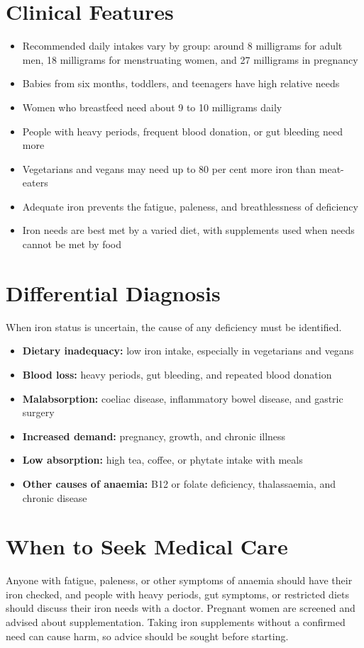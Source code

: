 \section*{Clinical Features}
\begin{itemize}
    \item Recommended daily intakes vary by group: around 8 milligrams for adult men, 18 milligrams for menstruating women, and 27 milligrams in pregnancy
    \item Babies from six months, toddlers, and teenagers have high relative needs
    \item Women who breastfeed need about 9 to 10 milligrams daily
    \item People with heavy periods, frequent blood donation, or gut bleeding need more
    \item Vegetarians and vegans may need up to 80 per cent more iron than meat-eaters
    \item Adequate iron prevents the fatigue, paleness, and breathlessness of deficiency
    \item Iron needs are best met by a varied diet, with supplements used when needs cannot be met by food
\end{itemize}

\section*{Differential Diagnosis}
When iron status is uncertain, the cause of any deficiency must be identified.
\begin{itemize}
    \item \textbf{Dietary inadequacy:} low iron intake, especially in vegetarians and vegans
    \item \textbf{Blood loss:} heavy periods, gut bleeding, and repeated blood donation
    \item \textbf{Malabsorption:} coeliac disease, inflammatory bowel disease, and gastric surgery
    \item \textbf{Increased demand:} pregnancy, growth, and chronic illness
    \item \textbf{Low absorption:} high tea, coffee, or phytate intake with meals
    \item \textbf{Other causes of anaemia:} B12 or folate deficiency, thalassaemia, and chronic disease
\end{itemize}

\section*{When to Seek Medical Care}
Anyone with fatigue, paleness, or other symptoms of anaemia should have their iron checked, and people with heavy periods, gut symptoms, or restricted diets should discuss their iron needs with a doctor. Pregnant women are screened and advised about supplementation. Taking iron supplements without a confirmed need can cause harm, so advice should be sought before starting.

